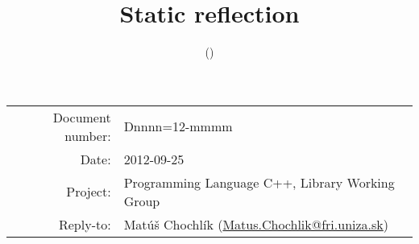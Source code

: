 \documentclass[11pt,a4paper,oneside]{article}
\title{Static reflection}
\author{\mchname (\mchmail)}
\makeatletter
\newcommand{\mchmail}{Matus.Chochlik@fri.uniza.sk}
\newcommand{\docnum}{Dnnnn=12-mmmm}
\newcommand{\docdate}{2012-09-25}
\makeatother
\begin{document}
\begin{tabular}{r l}
Document number: & \docnum\\
Date: & \docdate\\
Project: & Programming Language C++, Library Working Group \\
Reply-to: & Mat\'{u}\v{s} Chochl\'{i}k (\href{mailto:\mchmail}{\mchmail})\\
\end{tabular}


\tableofcontents










\end{document}
